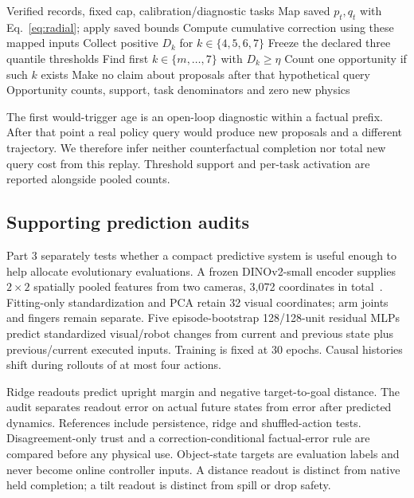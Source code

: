 \documentclass[sigconf,dvipsnames]{acmart}
\begin{document}
\begin{algorithm}[t]
\caption{Saved-trace trigger-opportunity diagnostic}
\label{alg:replay}
\begin{algorithmic}[1]
\Require Verified records, fixed cap, calibration/diagnostic tasks
  \State Map saved $p_t,q_t$ with Eq.~\eqref{eq:radial}; apply saved bounds
  \State Compute cumulative correction using these mapped inputs
  \State Collect positive $D_k$ for $k\in\{4,5,6,7\}$
\EndFor
\State Freeze the declared three quantile thresholds
  \State Find first $k\in\{m,\ldots,7\}$ with $D_k\ge\eta$
  \State Count one opportunity if such $k$ exists
  \State Make no claim about proposals after that hypothetical query
\EndFor
\Ensure Opportunity counts, support, task denominators and zero new physics
\end{algorithmic}
\end{algorithm}

The first would-trigger age is an open-loop diagnostic within a factual prefix.
After that point a real policy query would produce new proposals and a different
trajectory. We therefore infer neither counterfactual completion nor total new
query cost from this replay. Threshold support and per-task activation are reported
alongside pooled counts.

\subsection{Supporting prediction audits}
Part 3 separately tests whether a compact predictive system is useful enough to
help allocate evolutionary evaluations. A frozen DINOv2-small encoder supplies
$2\times2$ spatially pooled features from two cameras, 3,072 coordinates
in total~\cite{dinov2}. Fitting-only standardization and PCA retain 32 visual
coordinates; arm joints and fingers remain separate. Five episode-bootstrap
128/128-unit residual MLPs predict standardized visual/robot changes from current
and previous state plus previous/current executed inputs. Training is fixed at
30 epochs. Causal histories shift during rollouts of at most four actions.

Ridge readouts predict upright margin and negative target-to-goal distance. The
audit separates readout error on actual future states from error after predicted
dynamics. References include persistence, ridge and shuffled-action tests.
Disagreement-only trust and a correction-conditional factual-error rule are compared
before any physical use. Object-state targets are evaluation labels and never
become online controller inputs. A distance readout is distinct from native held
completion; a tilt readout is distinct from spill or drop safety.
\end{document}

